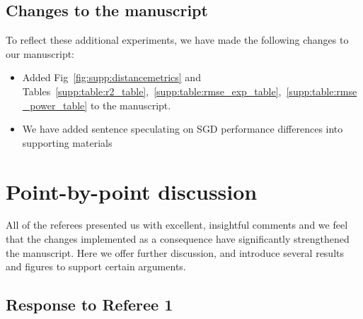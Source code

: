 \documentclass[12pt,a4paper]{article}
\begin{document}
\subsection{Changes to the manuscript}
To reflect these additional experiments, we have made the following changes to our manuscript:
\begin{itemize}
	\item Added Fig~\ref{fig:supp:distancemetrics} and Tables~\ref{supp:table:r2_table},~\ref{supp:table:rmse_exp_table},~\ref{supp:table:rmse_power_table} to the manuscript.
	\item We have added sentence speculating on SGD performance differences into supporting materials
\end{itemize}



%
%
\clearpage
\section{Point-by-point discussion}
All of the referees presented us with excellent, insightful comments and we feel that the changes implemented as a consequence have signiﬁcantly strengthened the manuscript. Here we offer further discussion, and introduce several results and figures to support certain arguments.

\subsection{Response to Referee 1}
\end{document}
